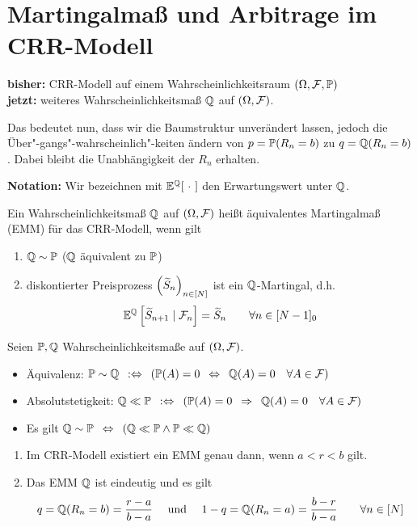 \section{Martingalmaß und Arbitrage im CRR-Modell}

\textbf{bisher:} CRR-Modell auf einem Wahrscheinlichkeitsraum $(\Omega, \F, \P)$ \\
\textbf{jetzt:} weiteres Wahrscheinlichkeitsmaß $\Q$ auf $(\Omega, \F)$.

Das bedeutet nun, dass wir die Baumstruktur unverändert lassen, jedoch die Über"-gangs"-wahrscheinlich"-keiten ändern von $p = \P(R_n = b)$ zu $q = \Q(R_n = b)$. Dabei bleibt die Unabhängigkeit der $R_n$ erhalten.

\textbf{Notation:} Wir bezeichnen mit $\E^\Q[\ \cdot \ ]$ den Erwartungswert unter $\Q$.

\begin{*definition}
	Ein Wahrscheinlichkeitsmaß $\Q$ auf $(\Omega, \F)$ heißt äquivalentes Martingalmaß (EMM) für das CRR-Modell, wenn gilt
	\begin{enumerate}
		\item $\Q \sim \P$ ($\Q$ äquivalent zu $\P$)
		\item diskontierter Preisprozess $\folge{\schlange{S}_n}{n \in [N]}$ ist ein $\Q$-Martingal, d.h.
		\begin{equation*}
		\E^\Q \sqbrackets{\schlange{S}_{n+1} \mid \F_n} = \schlange{S}_n \qquad \forall n \in [N-1]_0
		\end{equation*}
	\end{enumerate}
\end{*definition}

\begin{*bemerkung_inline}
	Seien $\P, \Q$ Wahrscheinlichkeitsmaße auf $(\Omega, \F)$.
	\begin{itemize}
		\item Äquivalenz: $\P \sim \Q \defequiv \brackets{\P(A) = 0 \equivalent \Q(A) = 0 \quad \forall A \in \F}$
		\item Absolutstetigkeit: $\Q \ll \P  \defequiv \brackets{\P(A) = 0 \follows \Q(A) = 0 \quad \forall A \in \F}$
		\item Es gilt $\Q \sim \P \equivalent \brackets{\Q \ll \P \land \P \ll \Q}$
	\end{itemize}
\end{*bemerkung_inline}

\begin{theorem}
	\begin{enumerate}[label=(\alph*)]
		\item Im CRR-Modell existiert ein EMM genau dann, wenn $a < r < b$ gilt.
		\item Das EMM $\Q$ ist eindeutig und es gilt
		\begin{align*}
			q = \Q(R_n = b) = \frac{r-a}{b-a} \quad \und \quad 1-q = \Q(R_n = a) = \frac{b-r}{b-a} \qquad \forall n \in [N]
		\end{align*}
	\end{enumerate}
\end{theorem}


